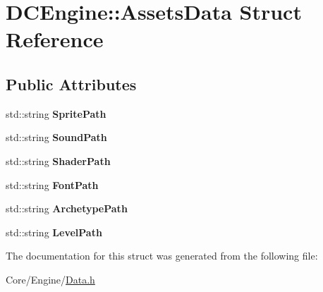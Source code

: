 \hypertarget{structDCEngine_1_1AssetsData}{\section{D\-C\-Engine\-:\-:Assets\-Data Struct Reference}
\label{structDCEngine_1_1AssetsData}
}
\subsection*{Public Attributes}
\begin{DoxyCompactItemize}
\item 
\hypertarget{structDCEngine_1_1AssetsData_a4081b46a44001df660a05c8c2a629a53}{std\-::string {\bfseries Sprite\-Path}}\label{structDCEngine_1_1AssetsData_a4081b46a44001df660a05c8c2a629a53}

\item 
\hypertarget{structDCEngine_1_1AssetsData_a0324e93c7244faf94a60d74930a73aa6}{std\-::string {\bfseries Sound\-Path}}\label{structDCEngine_1_1AssetsData_a0324e93c7244faf94a60d74930a73aa6}

\item 
\hypertarget{structDCEngine_1_1AssetsData_a864533f5037bd6aba7bddcfd66a94e03}{std\-::string {\bfseries Shader\-Path}}\label{structDCEngine_1_1AssetsData_a864533f5037bd6aba7bddcfd66a94e03}

\item 
\hypertarget{structDCEngine_1_1AssetsData_ae86cec8b75e80abec24246ee595a000d}{std\-::string {\bfseries Font\-Path}}\label{structDCEngine_1_1AssetsData_ae86cec8b75e80abec24246ee595a000d}

\item 
\hypertarget{structDCEngine_1_1AssetsData_ac253a62e53760aa4bb619825b7b8f402}{std\-::string {\bfseries Archetype\-Path}}\label{structDCEngine_1_1AssetsData_ac253a62e53760aa4bb619825b7b8f402}

\item 
\hypertarget{structDCEngine_1_1AssetsData_a357871283992cbbec2d8217f1a5321cb}{std\-::string {\bfseries Level\-Path}}\label{structDCEngine_1_1AssetsData_a357871283992cbbec2d8217f1a5321cb}

\end{DoxyCompactItemize}


The documentation for this struct was generated from the following file\-:\begin{DoxyCompactItemize}
\item 
Core/\-Engine/\hyperlink{Data_8h}{Data.\-h}\end{DoxyCompactItemize}
